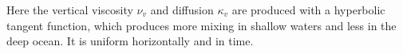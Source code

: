 Here the vertical viscosity $\nu_v$ and diffusion $\kappa_v$ are produced with a hyperbolic tangent function, which produces more mixing in shallow waters and less in the deep ocean.  It is uniform horizontally and in time.


